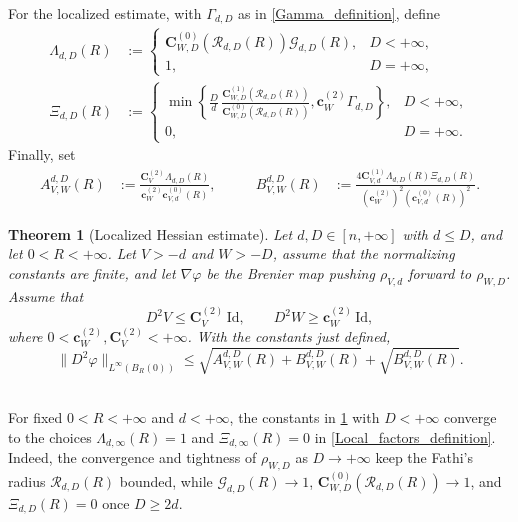 \documentclass[11pt,a4paper,reqno]{amsart}
\numberwithin{equation}{section}
\newtheorem{theorem}{Theorem}[section]
\theoremstyle{definition}
\newcommand{\<}{\ensuremath \leq}
\renewcommand{\>}{\ensuremath \geq}
\newcommand{\CV}{\mathbf{C}_V}
\newcommand{\cW}{\mathbf{c}_W}
\newcommand{\CVp}[1]{\mathbf{C}_{V,#1}}
\newcommand{\CWp}[1]{\mathbf{C}_{W,#1}}
\newcommand{\cVp}[1]{\mathbf{c}_{V,#1}}
\begin{document}
For the localized estimate, with $\Gamma_{d,D}$ as in \cref{Gamma_definition}, define
\begin{equation}\label{Local_factors_definition}
\begin{aligned}
\Lambda_{d,D}(R)
&:=
\begin{cases}
\displaystyle
\CWp{D}^{(0)}(\mathcal R_{d,D}(R))\mathcal G_{d,D}(R), & D<+\infty,\\[0.8em]
1, & D=+\infty,
\end{cases}\\[1.2em]
\Xi_{d,D}(R)
&:=
\begin{cases}
\displaystyle
\min\left\{
\frac{D}{d}\,
\frac{\CWp{D}^{(1)}(\mathcal R_{d,D}(R))}
{\CWp{D}^{(0)}(\mathcal R_{d,D}(R))},
\cW^{(2)}\Gamma_{d,D}
\right\},
& D<+\infty,\\[0.8em]
0, & D=+\infty.
\end{cases}
\end{aligned}
\end{equation}
Finally, set
\[
\begin{aligned}
A_{V,W}^{d,D}(R)
&:=
\frac{\CV^{(2)}\Lambda_{d,D}(R)}
{\cW^{(2)}\cVp{d}^{(0)}(R)},
\qquad&
B_{V,W}^{d,D}(R)
&:=
\frac{4\CVp{d}^{(1)}\Lambda_{d,D}(R)\Xi_{d,D}(R)}
{(\cW^{(2)})^2(\cVp{d}^{(0)}(R))^2}.
\end{aligned}
\]

\begin{theorem}[Localized Hessian estimate]\label{Intro_local_theorem}
Let $d,D\in[n,+\infty]$ with $d\le D$, and let $0<R<+\infty$. Let $V>-d$ and $W>-D$, assume that the normalizing constants are finite, and let $\nabla\varphi$ be the Brenier map pushing $\rho_{V,d}$ forward to $\rho_{W,D}$. Assume that
\[
    D^2V\le \CV^{(2)}\,\mathrm{Id}, \qquad
    D^2W\ge \cW^{(2)}\,\mathrm{Id},
\]
where $0<\cW^{(2)},\CV^{(2)}<+\infty$. With the constants just defined,
\[
    \|D^2\varphi\|_{L^\infty(B_R(0))}
    \le
    \sqrt{A_{V,W}^{d,D}(R)+B_{V,W}^{d,D}(R)}+\sqrt{B_{V,W}^{d,D}(R)}.
\]
\end{theorem}

\hfill \\
For fixed $0<R<+\infty$ and $d<+\infty$, the constants in \cref{Intro_local_theorem} with $D<+\infty$ converge to the choices $\Lambda_{d,\infty}(R)=1$ and $\Xi_{d,\infty}(R)=0$ in \cref{Local_factors_definition}. Indeed, the convergence and tightness of $\rho_{W,D}$ as $D\to+\infty$ keep the Fathi's radius $\mathcal R_{d,D}(R)$ bounded, while $\mathcal G_{d,D}(R)\to1$, $\CWp{D}^{(0)}(\mathcal R_{d,D}(R))\to1$, and $\Xi_{d,D}(R)=0$ once $D\ge2d$. 
\end{document}
